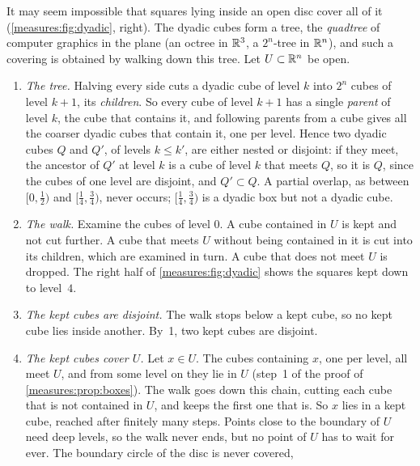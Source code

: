 \begin{notechapter}
\begin{remark}\label{measures:rem:filling}
It may seem impossible that squares lying inside an open disc cover all
of it (\cref{measures:fig:dyadic}, right). The dyadic cubes form a tree,
the \emph{quadtree} of computer graphics in the plane (an octree in
$\mathbb{R}^3$, a $2^n$-tree in $\mathbb{R}^n$), and such a covering is obtained by
walking down this tree. Let $U\subset\mathbb{R}^n$ be open.
\begin{enumerate}[nosep]
  \item \emph{The tree.} Halving every side cuts a dyadic cube of level
        $k$ into $2^n$ cubes of level $k + 1$, its \emph{children}. So
        every cube of level $k + 1$ has a single \emph{parent} of level
        $k$, the cube that contains it, and following parents from a
        cube gives all the coarser dyadic cubes that contain it, one per
        level. Hence two dyadic cubes $Q$ and $Q'$, of levels
        $k\leq k'$, are either nested or disjoint: if they meet, the
        ancestor of $Q'$ at level $k$ is a cube of level $k$ that meets
        $Q$, so it is $Q$, since the cubes of one level are disjoint,
        and $Q'\subset Q$. A partial overlap, as between $[0, \frac12)$
        and $[\frac14, \frac34)$, never occurs; $[\frac14, \frac34)$ is
        a dyadic box but not a dyadic cube.
  \item \emph{The walk.} Examine the cubes of level $0$. A cube
        contained in $U$ is kept and not cut further. A cube that meets
        $U$ without being contained in it is cut into its children,
        which are examined in turn. A cube that does not meet $U$ is
        dropped. The right half of \cref{measures:fig:dyadic} shows the
        squares kept down to level~$4$.
  \item \emph{The kept cubes are disjoint.} The walk stops below a kept
        cube, so no kept cube lies inside another. By~1, two kept cubes
        are disjoint.
  \item \emph{The kept cubes cover $U$.} Let $x\in U$. The cubes
        containing $x$, one per level, all meet $U$, and from some level
        on they lie in $U$ (step~1 of the proof of
        \cref{measures:prop:boxes}). The walk goes down this chain,
        cutting each cube that is not contained in $U$, and keeps the
        first one that is. So $x$ lies in a kept cube, reached after
        finitely many steps. Points close to the boundary of $U$ need
        deep levels, so the walk never ends, but no point of $U$ has to
        wait for ever. The boundary circle of the disc is never covered,

\end{enumerate}
\end{remark}
\end{notechapter}
